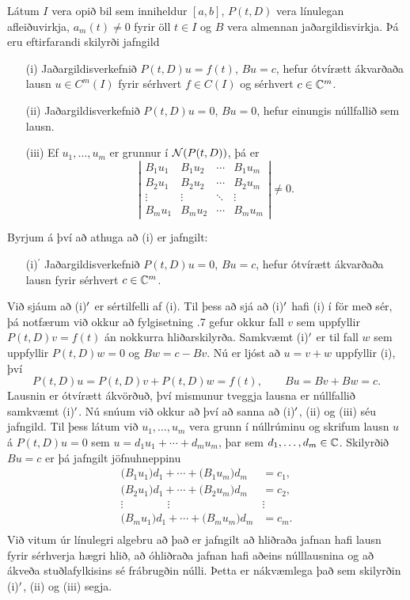 \begin{se}\label{set2.1.6} Látum $I$ vera opið bil sem inniheldur $[a,b]$, $P(t,D)$ vera
línulegan afleiðuvirkja, $a_m(t)\neq 0$ fyrir
öll $t\in I$ og $B$ vera almennan jaðargildisvirkja.
Þá eru eftirfarandi skilyrði jafngild
\begin{itemize}
\item[(i)] Jaðargildisverkefnið $P(t,D)u=f(t)$, $Bu=c$,
hefur ótvírætt ákvarðaða lausn $u\in C^m(I)$ fyrir sérhvert $f\in C(I)$
og sérhvert $c\in {\mathbb C}^m$.
\item[(ii)] Jaðargildisverkefnið $P(t,D)u=0$, $Bu=0$,
hefur einungis núllfallið sem lausn.
\item[(iii)]  Ef $u_1,\dots,u_m$ er grunnur í ${\cal N}(P(t,D))$, þá er
$$
\left|\begin{matrix} B_1u_1 & B_1u_2 & \cdots & B_1u_m\\
B_2u_1 & B_2u_2 & \cdots & B_2u_m\\
\vdots & \vdots &\ddots & \vdots \\
B_mu_1 & B_mu_2 & \cdots & B_mu_m
\end{matrix}\right|\neq 0.
$$
\end{itemize}
\end{se}

\begin{so}
Byrjum á því að athuga að (i) er jafngilt:
\begin{itemize}
\item[(i)$^\prime$] Jaðargildisverkefnið 
$P(t,D)u=0$, $Bu=c$,
hefur ótvírætt ákvarðaða lausn fyrir sérhvert $c\in {\mathbb C}^m$.
\end{itemize}
Við sjáum að (i)${\sp{\prime}}$ er sértilfelli af (i).  Til þess að sjá að
(i)${\sp{\prime}}$ hafi (i) í för með sér,  þá notfærum við okkur að
fylgisetning .7 gefur okkur fall $v$ sem uppfyllir
$P(t,D)v=f(t)$ án nokkurra hliðarskilyrða.  Samkvæmt (i)${\sp{\prime}}$ er til
fall $w$ sem uppfyllir $P(t,D)w=0$ og $Bw=c-Bv$.  Nú er ljóst að $u=v+w$
uppfyllir (i), því 
$$
P(t,D)u=P(t,D)v+P(t,D)w=f(t), \qquad Bu=Bv+Bw=c.
$$
Lausnin er ótvírætt ákvörðuð, því mismunur tveggja lausna er núllfallið
samkvæmt (i)${\sp{\prime}}$.
Nú snúum við okkur að því að sanna að (i)${\sp{\prime}}$, (ii) og (iii) séu
jafngild. Til þess látum við
$u_1,\dots,u_m$ vera grunn í núllrúminu og skrifum lausn $u$ á
$P(t,D)u=0$ sem $u=d_1u_1+\cdots+d_mu_m$, þar sem $d_1,\dots,d_m\in {\mathbb C}$.
Skilyrðið $Bu=c$ er þá jafngilt jöfnuhneppinu
\begin{align*}
\big(B_1u_1)d_1+\cdots+\big(B_1u_m\big)d_m &=c_1,\\
\big(B_2u_1)d_1+\cdots+\big(B_2u_m\big)d_m &=c_2,\\
\vdots\qquad\qquad\vdots\qquad\qquad & \vdots \\
\big(B_mu_1)d_1+\cdots+\big(B_mu_m\big)d_m &=c_m.\\
\end{align*}
Við vitum úr línulegri algebru að það er jafngilt að hliðraða jafnan
hafi lausn fyrir sérhverja hægri hlið, 
að óhliðraða jafnan hafi aðeins núlllausnina og að
ákveða stuðlafylkisins sé frábrugðin núlli.  Þetta er nákvæmlega það
sem skilyrðin (i)${\sp{\prime}}$, (ii) og (iii) segja.
\end{so}


